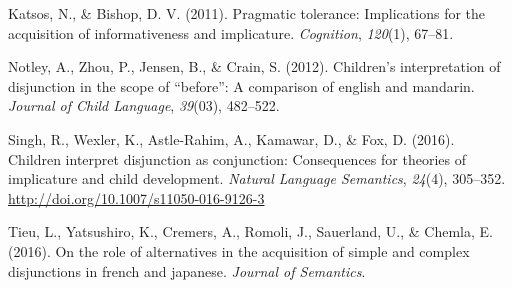 \documentclass[10pt, letterpaper]{article}
\begin{document}
\hypertarget{ref-katsos2011pragmatic}{}
Katsos, N., \& Bishop, D. V. (2011). Pragmatic tolerance: Implications
for the acquisition of informativeness and implicature.
\emph{Cognition}, \emph{120}(1), 67--81.

\hypertarget{ref-notley2012children}{}
Notley, A., Zhou, P., Jensen, B., \& Crain, S. (2012). Children's
interpretation of disjunction in the scope of ``before'': A comparison
of english and mandarin. \emph{Journal of Child Language},
\emph{39}(03), 482--522.

\hypertarget{ref-Singh2016}{}
Singh, R., Wexler, K., Astle-Rahim, A., Kamawar, D., \& Fox, D. (2016).
Children interpret disjunction as conjunction: Consequences for theories
of implicature and child development. \emph{Natural Language Semantics},
\emph{24}(4), 305--352. \url{http://doi.org/10.1007/s11050-016-9126-3}

\hypertarget{ref-tieu2016}{}
Tieu, L., Yatsushiro, K., Cremers, A., Romoli, J., Sauerland, U., \&
Chemla, E. (2016). On the role of alternatives in the acquisition of
simple and complex disjunctions in french and japanese. \emph{Journal of
Semantics}.
\end{document}
